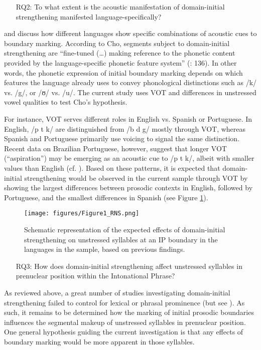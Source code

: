 \documentclass[output=paper]{langscibook}
\begin{document}
\begin{enumerate}
    \item[RQ2:] To what extent is the acoustic manifestation of domain-initial strengthening manifested language-specifically?
\end{enumerate}



\citet{cm05} and \citet{c16} discuss how different languages show specific combinations of acoustic cues to boundary marking. According to Cho, segments subject to domain-initial strengthening are “fine-tuned (…) making reference to the phonetic content provided by the language-specific phonetic feature system” (\cite{c16}: 136). In other words, the phonetic expression of initial boundary marking depends on which features the language already uses to convey phonological distinctions such as /k/ vs. /g/, or /ʊ/ vs. /u/. The current study uses VOT and differences in unstressed vowel qualities to test Cho’s hypothesis.

For instance, VOT serves different roles in English vs. Spanish or Portuguese. In English, /p t k/ are distinguished from /b d g/ mostly through VOT, whereas Spanish and Portuguese primarily use voicing to signal the same distinction. Recent data on Brazilian Portuguese, however, suggest that longer VOT (“aspiration”) may be emerging as an acoustic cue to /p t k/, albeit with smaller values than English (cf. \citealt{aspks08, Ahn18}). Based on these patterns, it is expected that domain-initial strengthening would be observed in the current sample through VOT by showing the largest differences between prosodic contexts in English, followed by Portuguese, and the smallest differences in Spanish (see Figure \ref{fig:fig1}).


\begin{figure}
\texttt{[image: figures/Figure1\_RNS.png]}
\caption{Schematic representation of the expected effects of domain-initial strengthening on unstressed syllables at an IP boundary in the languages in the sample, based on previous findings.\label{fig:fig1}}
\end{figure}


\begin{enumerate}
    \item[RQ3:] How does domain-initial strengthening affect unstressed syllables in prenuclear position within the Intonational Phrase?
\end{enumerate}


As reviewed above, a great number of studies investigating domain-initial strengthening failed to control for lexical or phrasal prominence (but see \citealt{kkc18}). As such, it remains to be determined how the marking of initial prosodic boundaries influences the segmental makeup of  unstressed syllables in prenuclear position. One general hypothesis guiding the current investigation is that any effects of boundary marking would be more apparent in those syllables.
\end{document}
